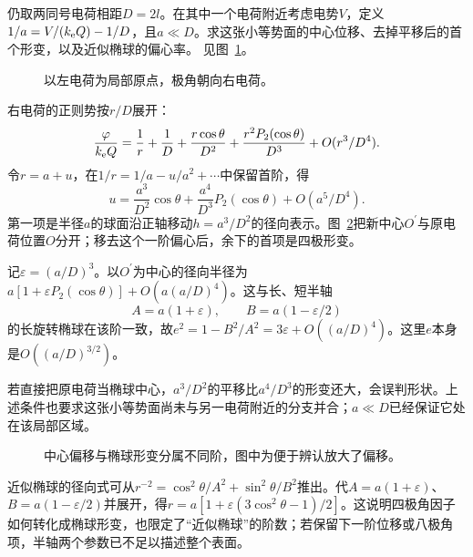 \begin{example}[单个电荷附近的等势面形变]\label{ex:es2-e6}
仍取两同号电荷相距$D=2l$。在其中一个电荷附近考虑电势$V$，定义$1/a=V/(k_{\rm e} Q)-1/D$，且$a\ll D$。求这张小等势面的中心位移、去掉平移后的首个形变，以及近似椭球的偏心率。 见图~\ref{fig:es2-e6-q}。
\end{example}

\begin{figure}[H]\centering
{}
\caption{以左电荷为局部原点，极角朝向右电荷。}\label{fig:es2-e6-q}
\end{figure}
\begin{solution}
右电荷的正则势按$r/D$展开：
\[\frac{\varphi}{k_{\rm e} Q}=\frac1r+\frac1D+\frac{r\cos\theta}{D^2}+\frac{r^2P_2(\cos\theta)}{D^3}+O(r^3/D^4).
\]
令$r=a+u$，在$1/r=1/a-u/a^2+\cdots$中保留首阶，得
\[u=\frac{a^3}{D^2}\cos\theta+\frac{a^4}{D^3}P_2(\cos\theta)+O(a^5/D^4).
\]
第一项是半径$a$的球面沿正轴移动$h=a^3/D^2$的径向表示。图~\ref{fig:es2-e6-s}把新中心$O^{\prime}$与原电荷位置$O$分开；移去这个一阶偏心后，余下的首项是四极形变。

记$\varepsilon=(a/D)^3$。以$O^{\prime}$为中心的径向半径为$a[1+\varepsilon P_2(\cos\theta)]+O(a(a/D)^4)$。这与长、短半轴
\[A=a(1+\varepsilon),\qquad B=a(1-\varepsilon/2)\]
的长旋转椭球在该阶一致，故$e^2=1-B^2/A^2=3\varepsilon+O((a/D)^4)$。这里$e$本身是$O((a/D)^{3/2})$。

若直接把原电荷当椭球中心，$a^3/D^2$的平移比$a^4/D^3$的形变还大，会误判形状。上述条件也要求这张小等势面尚未与另一电荷附近的分支并合；$a\ll D$已经保证它处在该局部区域。
\begin{figure}[H]\centering
{}
\caption{中心偏移与椭球形变分属不同阶，图中为便于辨认放大了偏移。}\label{fig:es2-e6-s}
\end{figure}


近似椭球的径向式可从$r^{-2}=\cos^2\theta/A^2+\sin^2\theta/B^2$推出。代$A=a(1+\varepsilon)$、$B=a(1-\varepsilon/2)$并展开，得$r=a[1+\varepsilon(3\cos^2\theta-1)/2]$。这说明四极角因子如何转化成椭球形变，也限定了“近似椭球”的阶数；若保留下一阶位移或八极角项，半轴两个参数已不足以描述整个表面。
\end{solution}

